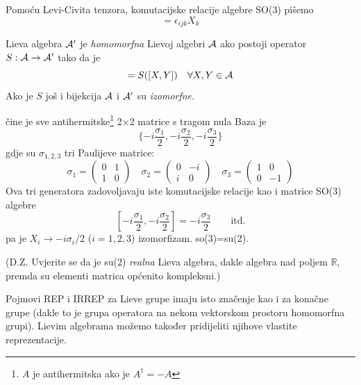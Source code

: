 Pomoću Levi-Civita tenzora, komutacijske relacije algebre SO(3) pišemo
\begin{displaymath}
 [X_i, X_j]=\epsilon_{ijk} X_k  
\end{displaymath}

Lieva algebra $\mathcal{A}'$ je \emph{homomorfna} Lievoj algebri $\mathcal{A}$ ako postoji 
operator $S:\mathcal{A}\to\mathcal{A}'$ tako da je
\begin{displaymath}
       [S(X), S(Y)]=S([X,Y]) \quad \forall X, Y \in\calA
\end{displaymath}
Ako je $S$ još i bijekcija $\mathcal{A}$ i $\mathcal{A}'$ su \emph{izomorfne}.

\begin{primjer}
 čine je sve antihermitske\footnote{$A$ je antihermitska ako je $A^\dagger=-A$} 
2$\times$2 matrice s tragom nula Baza je 
\[
     \{ -i\frac{\sigma_1}{2},  -i\frac{\sigma_2}{2},  -i\frac{\sigma_3}{2} \}
\]
gdje su $\sigma_{1,2,3}$ tri Paulijeve matrice:
\begin{equation}
\sigma_1=\left( \begin{array}{cc} 0 &  1 \\ 1 & 0 \end{array} \right)
\quad
\sigma_2=\left( \begin{array}{cc} 0 & -i \\ i & 0 \end{array} \right)
\quad
\sigma_3=\left( \begin{array}{cc} 1 &  0 \\ 0 &-1 \end{array} \right)
\label{eq:PaulijeveMatrice}
\end{equation}
Ova tri generatora zadovoljavaju iste komutacijske relacije kao i matrice
SO(3) algebre
\begin{displaymath}
 \left[ -i\frac{\sigma_1}{2}, -i\frac{\sigma_2}{2} \right] =
 -i\frac{\sigma_3}{2} \qquad \text{itd.}
\end{displaymath}
pa je $X_i \to -i \sigma_i/2$ ($i=1,2,3$) izomorfizam.
so(3)=su(2).

(D.Z. Uvjerite se da je su(2) \emph{realna} Lieva algebra, dakle algebra
nad poljem $\mathbb{R}$, premda su elementi matrica općenito kompleksni.)
\end{primjer}

Pojmovi REP i IRREP za Lieve grupe imaju isto značenje kao i za
konačne grupe (dakle to je grupa operatora na nekom vektorskom prostoru
homomorfna grupi). Lievim algebrama možemo također pridijeliti
njihove vlastite reprezentacije.

